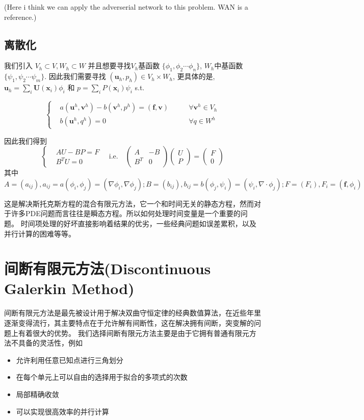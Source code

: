 (Here i think we can apply the adverserial network to this problem. WAN is a reference.)
\subsection{离散化}

我们引入 $V_h\subset V, W_h\subset W$ 并且想要寻找$V_h$基函数 $\{\phi_1,\phi_2\cdots \phi_n\}$,  $W_h$中基函数$\{\psi_1, \psi_2\cdots \psi_m\}$. 
因此我们需要寻找 $(\textbf{u}_h, p_h)\in V_h\times W_h$, 更具体的是, $\textbf{u}_h=\sum_i\textbf{U}(\textbf{x}_i)\phi_i$ 和 $p=\sum_iP(\textbf{x}_i)\psi_i$ s.t. 

$$\left\{
\begin{aligned}
    &a(\textbf{u}^h, \textbf{v}^h)-b(\textbf{v}^h,p^h)=(\textbf{f}, \textbf{v}) \qquad &\forall \textbf{v}^h\in V_h\\
    &b(\textbf{u}^h, q^h)=0\qquad &\forall q\in W^h
\end{aligned}
\right.$$

因此我们得到
$$\left\{
    \begin{aligned}
        &AU-BP=F\\
        &B^TU=0
    \end{aligned}
\right.\quad\text{i.e.}\quad 
\begin{pmatrix}
    A & -B\\
    B^T & 0
\end{pmatrix}\begin{pmatrix}
    U\\P
\end{pmatrix}=\begin{pmatrix}
    F\\0
\end{pmatrix}$$
其中 $A=(a_{ij}),a_{ij}=a(\phi_i, \phi_j)=(\nabla \phi_i, \nabla \phi_j);B=(b_{ij}),b_{ij}=b(\phi_j, \psi_i)=(\psi_i, \nabla\cdot\phi_j);F=(F_i),F_i=(\textbf{f},\phi_i)$

这是解决斯托克斯方程的混合有限元方法，它一个和时间无关的静态方程，然而对于许多PDE问题而言往往是瞬态方程。所以如何处理时间变量是一个重要的问题。
时间项处理的好坏直接影响着结果的优劣，一些经典问题如误差累积，以及并行计算的困难等等。

\section{间断有限元方法(Discontinuous Galerkin Method)}\label{Interior Penalty Discontinuous Galerkin Method}
间断有限元方法是最先被设计用于解决双曲守恒定律的经典数值算法，在近些年里逐渐变得流行，其主要特点在于允许解有间断性，这在解决拥有间断，突变解的问题上有着很大的优势。
我们选择间断有限元方法主要是由于它拥有普通有限元方法不具备的灵活性，例如
\begin{itemize}
    \item 允许利用任意已知点进行三角划分
    \item 在每个单元上可以自由的选择用于拟合的多项式的次数
    \item 局部精确收敛
    \item 可以实现很高效率的并行计算 
\end{itemize}

